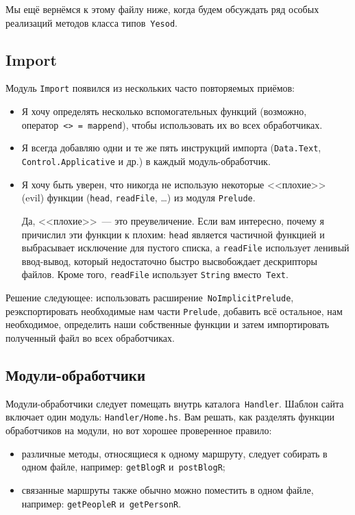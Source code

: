 Мы ещё вернёмся к этому файлу ниже, когда будем обсуждать ряд особых реализаций
методов класса типов~\lstinline!Yesod!.

\subsection{Import}
Модуль \lstinline!Import! появился из нескольких часто повторяемых приёмов:
\begin{itemize}
  \item Я хочу определять несколько вспомогательных функций (возможно,
      оператор~\lstinline!<> = mappend!), чтобы использовать их во всех
      обработчиках.
  \item Я всегда добавляю одни и те же пять инструкций импорта
      (\lstinline!Data.Text!, \lstinline!Control.Applicative! и др.) в каждый
      модуль-обработчик.
  \item Я хочу быть уверен, что никогда не использую некоторые <<плохие>> (evil)
      функции (\lstinline!head!, \lstinline!readFile!, \ldots) из модуля
      \lstinline!Prelude!.

    \begin{remark}
      Да, <<плохие>>~--- это преувеличение. Если вам интересно, почему я
      причислил эти функции к плохим: \lstinline!head! является частичной
      функцией и выбрасывает исключение для пустого списка, а
      \lstinline!readFile! использует ленивый ввод-вывод, который недостаточно
      быстро высвобождает дескрипторы файлов. Кроме того, \lstinline!readFile!
      использует \lstinline!String! вместо~\lstinline!Text!.
    \end{remark}
\end{itemize}

Решение следующее: использовать расширение~\lstinline!NoImplicitPrelude!,
реэкспортировать необходимые нам части \lstinline!Prelude!, добавить всё
остальное, нам необходимое, определить наши собственные функции и затем
импортировать полученный файл во всех обработчиках.

\subsection{Модули-обработчики}
Модули-обработчики следует помещать внутрь каталога~\lstinline!Handler!. Шаблон
сайта включает один модуль: \texttt{Handler/Home.hs}. Вам решать, как разделять
функции обработчиков на модули, но вот хорошее проверенное правило:
\begin{itemize}
  \item различные методы, относящиеся к одному маршруту, следует собирать в
      одном файле, например: \lstinline!getBlogR! и~\lstinline!postBlogR!;
  \item связанные маршруты также обычно можно поместить в одном файле, например:
      \lstinline!getPeopleR! и~\lstinline!getPersonR!.
\end{itemize}

